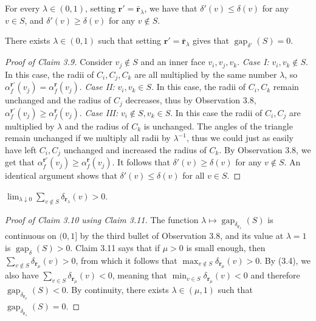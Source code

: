 \begin{claim}[3.9]
For every $\lambda\in(0,1)$, setting $\mathbf r'=\bar{\mathbf r}_\lambda$, we have that $\delta'(v)\le\delta(v)$ for any $v\in S$, and $\delta'(v)\ge\delta(v)$ for any $v\notin S$.
\end{claim}
\begin{claim}[3.10]
There exists $\lambda\in(0,1)$ such that setting $\mathbf r'=\bar{\mathbf r}_\lambda$ gives that $\operatorname{gap}_{\delta'}(S)=0$.
\end{claim}
\begin{proof}[Proof of Claim 3.9]
Consider $v_j\notin S$ and an inner face $v_i,v_j,v_k$.
\emph{Case I:} $v_i,v_k\notin S$. In this case, the radii of $C_i,C_j,C_k$ are all multiplied by the same number $\lambda$, so $\alpha_f^{\mathbf r'}(v_j)=\alpha_f^{\mathbf r}(v_j)$.
\emph{Case II:} $v_i,v_k\in S$. In this case, the radii of $C_i,C_k$ remain unchanged and the radius of $C_j$ decreases, thus by Observation 3.8, $\alpha_f^{\mathbf r'}(v_j)\ge\alpha_f^{\mathbf r}(v_j)$.
\emph{Case III:} $v_i\notin S,v_k\in S$. In this case the radii of $C_i,C_j$ are multiplied by $\lambda$ and the radius of $C_k$ is unchanged. The angles of the triangle remain unchanged if we multiply all radii by $\lambda^{-1}$, thus we could just as easily have left $C_i,C_j$ unchanged and increased the radius of $C_k$. By Observation 3.8, we get that $\alpha_f^{\mathbf r'}(v_j)\ge\alpha_f^{\mathbf r}(v_j)$.
It follows that $\delta'(v)\ge\delta(v)$ for any $v\notin S$. An identical argument shows that $\delta'(v)\le\delta(v)$ for all $v\in S$.
\end{proof}
\begin{claim}[3.11]
$\displaystyle\lim_{\lambda\downarrow0}\sum_{v\notin S}\delta_{\mathbf r_\lambda}(v)>0$.
\end{claim}
\begin{proof}[Proof of Claim 3.10 using Claim 3.11]
The function $\lambda\mapsto\operatorname{gap}_{\delta_{\mathbf r_\lambda}}(S)$ is continuous on $(0,1]$ by the third bullet of Observation 3.8, and its value at $\lambda=1$ is $\operatorname{gap}_{\delta}(S)>0$. Claim 3.11 says that if $\mu>0$ is small enough, then
$\sum_{v\notin S}\delta_{\mathbf r_\mu}(v)>0$, from which it follows that $\max_{v\notin S}\delta_{\mathbf r_\mu}(v)>0$. By (3.4), we also have $\sum_{v\in S}\delta_{\mathbf r_\mu}(v)<0$, meaning that $\min_{v\in S}\delta_{\mathbf r_\mu}(v)<0$ and therefore $\operatorname{gap}_{\delta_{\mathbf r_\mu}}(S)<0$. By continuity, there exists $\lambda\in(\mu,1)$ such that $\operatorname{gap}_{\delta_{\mathbf r_\lambda}}(S)=0$.
\end{proof}
